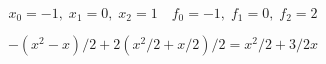 \[ x_0=-1, \; x_1=0, \; x_2=1 \quad f_0=-1, \; f_1=0, \; f_2=2 \]

\[ -(x^2-x)/2+2(x^2/2+x/2)/2=x^2/2+3/2x \]
